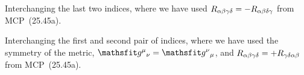 {	Interchanging the last two indices,
	where we have used $R_{\alpha \beta \gamma \delta} = -R_{\alpha \beta \delta \gamma}$ from MCP~(25.45a).
	
	Interchanging the first and second pair of indices,
	where we have used the symmetry of the metric, $\fv{\sg}{\mu}{\nu} = \fv{\sg}{\nu}{\mu}$, and $R_{\alpha \beta \gamma \delta} = +R_{\gamma \delta \alpha \beta}$ from MCP~(25.45a).

}
